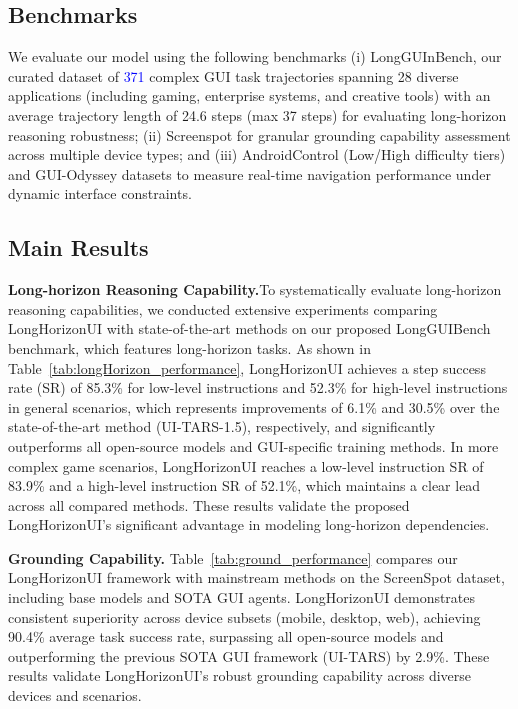 \documentclass{article} %
\newcommand{\mypara}[1]{\vspace{0.4em}\noindent\textbf{#1}\hspace{0.2cm}}
\newcommand{\revise}[1]{\textcolor{blue}{#1}}
\begin{document}
\subsection{Benchmarks}
\label{sec:Benchmark}

We evaluate our model using the following benchmarks (i) LongGUInBench, our curated dataset of \revise{371} complex GUI task trajectories spanning 28 diverse applications (including gaming, enterprise systems, and creative tools) with an average trajectory length of 24.6 steps (max 37 steps) for evaluating long-horizon reasoning robustness; (ii) Screenspot for granular grounding capability assessment across multiple device types; and (iii)  AndroidControl (Low/High difficulty tiers) \citep{NEURIPS2024_androidcontrol} and GUI-Odyssey \citep{2024_gui_odyssey} datasets to measure real-time navigation performance under dynamic interface constraints.









\subsection{Main Results}
\label{sec:results}


\mypara{Long-horizon Reasoning Capability.}To systematically evaluate long-horizon reasoning capabilities, we conducted extensive experiments comparing LongHorizonUI with state-of-the-art methods on our proposed LongGUIBench benchmark, which features long-horizon tasks. As shown in Table~\ref{tab:longHorizon_performance}, LongHorizonUI achieves a step success rate (SR) of 85.3\% for low-level instructions and 52.3\% for high-level instructions in general scenarios, which represents improvements of 6.1\% and 30.5\% over the state-of-the-art method (UI-TARS-1.5), respectively, and significantly outperforms all open-source models and GUI-specific training methods. In more complex game scenarios, LongHorizonUI reaches a low-level instruction SR of 83.9\% and a high-level instruction SR of 52.1\%, which maintains a clear lead across all compared methods. These results validate the proposed LongHorizonUI's significant advantage in modeling long-horizon dependencies.

\mypara{Grounding Capability.} Table~\ref{tab:ground_performance} compares our LongHorizonUI framework with mainstream methods on the ScreenSpot dataset, including base models and SOTA GUI agents. LongHorizonUI demonstrates consistent superiority across device subsets (mobile, desktop, web), achieving 90.4\% average task success rate, surpassing all open-source models and outperforming the previous SOTA GUI framework (UI-TARS) by 2.9\%. These results validate LongHorizonUI’s robust grounding capability across diverse devices and scenarios.
\end{document}
